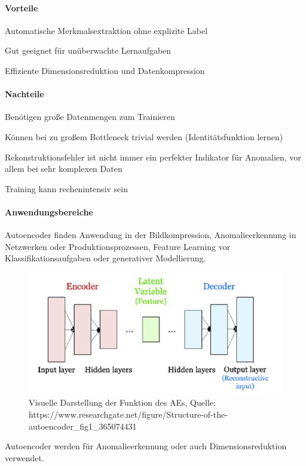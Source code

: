 \documentclass[a4paper,12pt]{article}
\begin{document}
	\paragraph{Vorteile}
	
	Automatische Merkmalsextraktion ohne explizite Label
	
	Gut geeignet für unüberwachte Lernaufgaben
	
	Effiziente Dimensionsreduktion und Datenkompression
	
	\paragraph{Nachteile}
	
	Benötigen große Datenmengen zum Trainieren
	
	Können bei zu großem Bottleneck trivial werden (Identitätsfunktion lernen)
	
	Rekonstruktionsfehler ist nicht immer ein perfekter Indikator für Anomalien, vor allem bei sehr komplexen Daten
	
	Training kann rechenintensiv sein
	
	\paragraph{Anwendungsbereiche}
	Autoencoder finden Anwendung in der Bildkompression, Anomalieerkennung in Netzwerken oder Produktionsprozessen, Feature Learning vor Klassifikationsaufgaben oder generativer Modellierung.
	
	\begin{figure}[H]
		\centering
		\includegraphics[width=0.7\linewidth]{screenshot004}
		\caption{Visuelle Darstellung der Funktion des AEs, Quelle: https://www.researchgate.net/figure/Structure-of-the-autoencoder\_fig1\_365074431}
		\label{fig:screenshot004}
	\end{figure}
	
	Autoencoder werden für Anomalieerkennung oder auch Dimensionsreduktion verwendet.
	
\end{document}
